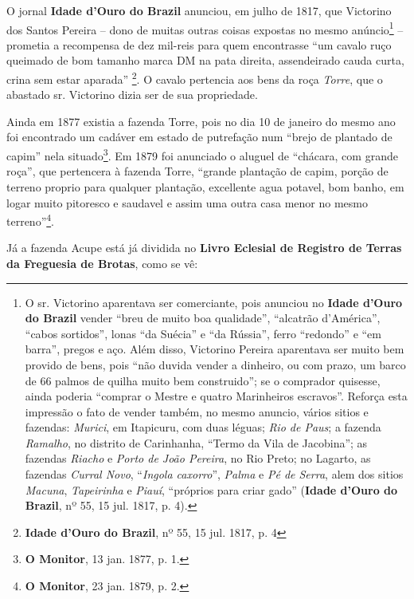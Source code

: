 \begin{citacao}
O jornal \textbf{Idade d'Ouro do Brazil} anunciou, em julho de 1817, que Victorino dos Santos Pereira -- dono de muitas outras coisas expostas no mesmo anúncio\footnote{O sr. Victorino aparentava ser comerciante, pois anunciou no \textbf{Idade d'Ouro do Brazil} vender ``breu de muito boa qualidade'', ``alcatrão d'América'', ``cabos sortidos'', lonas ``da Suécia'' e ``da Rússia'', ferro ``redondo'' e ``em barra'', pregos e aço. Além disso, Victorino Pereira aparentava ser muito bem provido de bens, pois ``não duvida vender a dinheiro, ou com prazo, um barco de 66 palmos de quilha muito bem construido''; se o comprador quisesse, ainda poderia ``comprar o Mestre e quatro Marinheiros escravos''. Reforça esta impressão o fato de vender também, no mesmo anuncio, vários sitios e fazendas: \textit{Murici}, em Itapicuru, com duas léguas; \textit{Rio de Paus}; a fazenda \textit{Ramalho}, no distrito de Carinhanha, ``Termo da Vila de Jacobina''; as fazendas \textit{Riacho} e \textit{Porto de João Pereira}, no Rio Preto; no Lagarto, as fazendas \textit{Curral Novo}, ``\textit{Ingola caxorro}'', \textit{Palma} e \textit{Pé de Serra}, alem dos sitios \textit{Macuna}, \textit{Tapeirinha} e \textit{Piauí}, ``próprios para criar gado'' (\textbf{Idade d'Ouro do Brazil}, nº 55, 15 jul. 1817, p. 4).} -- prometia a recompensa de dez mil-reis para quem encontrasse ``um cavalo ruço queimado de bom tamanho marca DM na pata direita, assendeirado cauda curta, crina sem estar aparada'' \footnote{\textbf{Idade d'Ouro do Brazil}, nº 55, 15 jul. 1817, p. 4}. O cavalo pertencia aos bens da roça \textit{Torre}, que o abastado sr. Victorino dizia ser de sua propriedade.

Ainda em 1877 existia a fazenda Torre, pois no dia 10 de janeiro do mesmo ano foi encontrado um cadáver em estado de putrefação num ``brejo de plantado de capim'' nela situado\footnote{\textbf{O Monitor}, 13 jan. 1877, p. 1.}. Em 1879 foi anunciado o aluguel de ``chácara, com grande roça'', que pertencera à fazenda Torre, ``grande plantação de capim, porção de terreno proprio para qualquer plantação, excellente agua potavel, bom banho, em logar muito pitoresco e saudavel e assim uma outra casa menor no mesmo terreno''\footnote{\textbf{O Monitor}, 23 jan. 1879, p. 2.}.

Já a fazenda Acupe está já dividida no \textbf{Livro Eclesial de Registro de Terras da Freguesia de Brotas}, como se vê:


\end{citacao}
